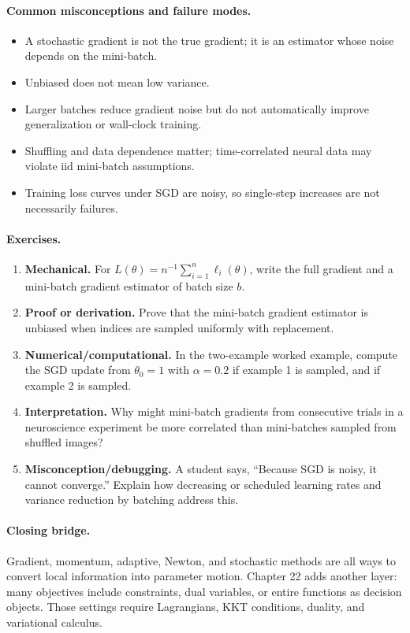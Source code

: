 \paragraph{Common misconceptions and failure modes.}
\begin{itemize}[leftmargin=*]
\item A stochastic gradient is not the true gradient; it is an estimator whose noise depends on the mini-batch.
\item Unbiased does not mean low variance.
\item Larger batches reduce gradient noise but do not automatically improve generalization or wall-clock training.
\item Shuffling and data dependence matter; time-correlated neural data may violate iid mini-batch assumptions.
\item Training loss curves under SGD are noisy, so single-step increases are not necessarily failures.
\end{itemize}

\paragraph{Exercises.}
\begin{enumerate}[label=\textbf{21.4.\arabic*.}, leftmargin=*]
\item \textbf{Mechanical.} For \(L(\theta)=n^{-1}\sum_{i=1}^n\ell_i(\theta)\), write the full gradient and a mini-batch gradient estimator of batch size \(b\).
\item \textbf{Proof or derivation.} Prove that the mini-batch gradient estimator is unbiased when indices are sampled uniformly with replacement.
\item \textbf{Numerical/computational.} In the two-example worked example, compute the SGD update from \(\theta_0=1\) with \(\alpha=0.2\) if example 1 is sampled, and if example 2 is sampled.
\item \textbf{Interpretation.} Why might mini-batch gradients from consecutive trials in a neuroscience experiment be more correlated than mini-batches sampled from shuffled images?
\item \textbf{Misconception/debugging.} A student says, ``Because SGD is noisy, it cannot converge.'' Explain how decreasing or scheduled learning rates and variance reduction by batching address this.
\end{enumerate}

\paragraph{Closing bridge.}
Gradient, momentum, adaptive, Newton, and stochastic methods are all ways to convert local information into parameter motion. Chapter 22 adds another layer: many objectives include constraints, dual variables, or entire functions as decision objects. Those settings require Lagrangians, KKT conditions, duality, and variational calculus.

\clearpage
